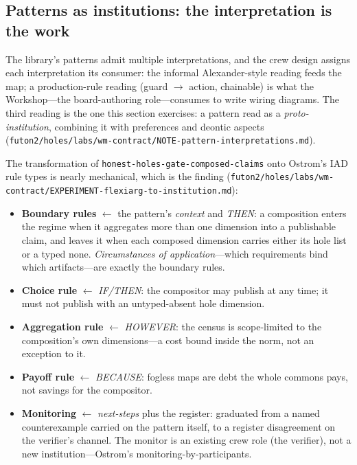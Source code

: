 \subsection{Patterns as institutions: the interpretation is the work}

The library's patterns admit multiple interpretations, and the crew
design assigns each interpretation its consumer: the informal
Alexander-style reading feeds the map; a production-rule reading (guard
$\to$ action, chainable) is what the Workshop---the board-authoring
role---consumes to write wiring diagrams. The third reading is the one
this section exercises: a pattern read as a \emph{proto-institution},
combining it with preferences and deontic aspects
(\texttt{futon2/holes/labs/wm-contract/NOTE-pattern-interpretations.md}).

The transformation of \texttt{honest-holes-gate-composed-claims} onto
Ostrom's IAD rule types is nearly mechanical, which is the finding
(\texttt{futon2/holes/labs/wm-contract/EXPERIMENT-flexiarg-to-institution.md}):

\begin{itemize}
\item \textbf{Boundary rules} $\leftarrow$ the pattern's \emph{context}
  and \emph{THEN}: a composition enters the regime when it aggregates
  more than one dimension into a publishable claim, and leaves it when
  each composed dimension carries either its hole list or a typed none.
  \emph{Circumstances of application}---which requirements bind which
  artifacts---are exactly the boundary rules.
\item \textbf{Choice rule} $\leftarrow$ \emph{IF/THEN}: the compositor
  may publish at any time; it must not publish with an untyped-absent
  hole dimension.
\item \textbf{Aggregation rule} $\leftarrow$ \emph{HOWEVER}: the census
  is scope-limited to the composition's own dimensions---a cost bound
  inside the norm, not an exception to it.
\item \textbf{Payoff rule} $\leftarrow$ \emph{BECAUSE}: fogless maps
  are debt the whole commons pays, not savings for the compositor.
\item \textbf{Monitoring} $\leftarrow$ \emph{next-steps} plus the
  register: graduated from a named counterexample carried on the
  pattern itself, to a register disagreement on the verifier's channel.
  The monitor is an existing crew role (the verifier), not a new
  institution---Ostrom's monitoring-by-participants.
\end{itemize}

